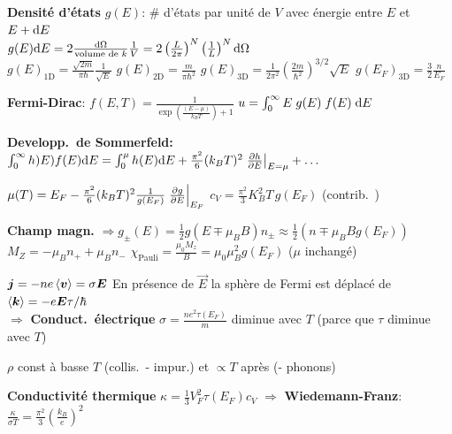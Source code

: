 \begin{squishlist}
    \item\textbf{Densité d'états} $g(E)$: \# d'états par unité de $V$ avec énergie entre $E$ et $E+\ud E$\\
    $g(E) \ud E = 2 \frac{\ud \Omega}{\text{volume de $k$}} \frac{1}{V} = 2  \left(\frac{L}{2\pi}\right)^N \left(\frac{1}{L}\right)^N \ud \Omega $ \\ 
    $g(E)_{\text{1D}} =\frac{\sqrt{2m}}{\pi \hbar}\frac{1}{\sqrt{E}}$ \quad
    $g(E)_{\text{2D}} = \frac{m}{\pi \hbar^2}$ \quad
    $g(E)_{\text{3D}} = \frac{1}{2\pi^2} \left(\frac{2m}{\hbar^2}\right)^{3/2}\sqrt{E}$ \quad $g(E_F)_{\text{3D}} = \frac{3}{2} \frac{n}{E_F}$
    \item \textbf{Fermi-Dirac}: $f(E,T) = \frac{1}{\exp\left(\frac{(E- \mu)}{k_B T}\right) + 1}$ \squishsep $u = \int_{0}^{\infty}E \; g(E)\; f(E) \; \ud E$
    \item \textbf{Developp.\ de Sommerfeld:} $\int_{0}^{\infty}h)E) f(E) \ud E = \int_{0}^{\mu} h(E) \ud E + \frac{\pi^2}{6}(k_BT)^2 \left.\D{E}{h}\right|_{E=\mu} + \ldots$
    \item $\mu(T) = E_F - \frac{\pi^2}{6}(k_B T)^2 \frac{1}{g(E_F)} \left.\D{E}{g}\right|_{E_F}$ \squishsep $c_V = \frac{\pi^2}{3}K_B^2 T \, g(E_F) $ (contrib.\ \elec)
    \item \textbf{Champ magn.} $\Rightarrow g_{\pm}(E) = \frac{1}{2}g(E\mp \mu_B B)$\qquad $n_{\pm} \approx \frac{1}{2}(n \mp \mu_B B g(E_F))$\\
    $M_Z = -\mu_B n_+ + \mu_B n_-$ \qquad$\chi_{\text{Pauli}} = \frac{\mu_0 M_z}{B} = \mu_0 \mu_B^2 g(E_F)$ \quad ($\mu$ inchangé) \\
    
    \item $\vec{j} = -ne \braket{\vec{v}} = \sigma \vec{E}$ \quad En présence de $\vec{E}$ la sphère de Fermi est déplacé de $\braket{\vk}=-e\vec{E}\tau / \hbar$ \\
    $\Longrightarrow$ \textbf{Conduct.\ électrique} $\sigma = \frac{n e^2 \tau(E_F)}{m}$ diminue avec $T$ (parce que $\tau$ diminue avec $T$)
    \item $\rho$ const à basse $T$ (collis.\ \elec - impur.) et $\propto T$ après (\elec - phonons)
    \item \textbf{Conductivité thermique} $\kappa = \frac{1}{3}V_F^2 \tau(E_F) c_V$ $\Rightarrow$ \textbf{Wiedemann-Franz}: $\frac{\kappa}{\sigma T} = \frac{\pi^2}{3}\left(\frac{k_B}{e}\right)^2$
\end{squishlist}



